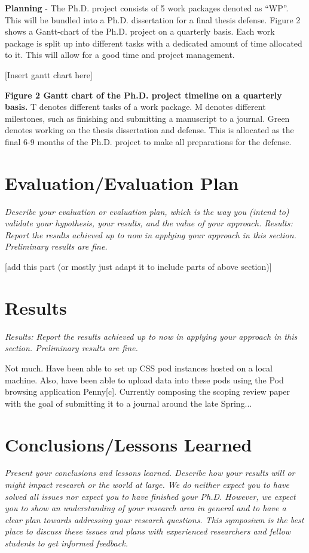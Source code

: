 \documentclass{article}
\begin{document}
\textbf{Planning} - The Ph.D. project consists of 5 work packages denoted as “WP”. This will be bundled into a Ph.D. dissertation for a final thesis defense. Figure 2 shows a Gantt-chart of the Ph.D. project on a quarterly basis.  Each work package is split up into different tasks with a dedicated amount of time allocated to it. This will allow for a good time and project management. 

[Insert gantt chart here]

\textbf{Figure 2 Gantt chart of the Ph.D. project timeline on a quarterly basis.} T denotes different tasks of a work package. M denotes different milestones, such as finishing and submitting a manuscript to a journal. Green denotes working on the thesis dissertation and defense. This is allocated as the final 6-9 months of the Ph.D. project to make all preparations for the defense. 


\section{Evaluation/Evaluation Plan}
\textit{Describe your evaluation or evaluation plan, which is the way you (intend to) validate your hypothesis, your results, and the value of your approach.
Results: Report the results achieved up to now in applying your approach in this section. Preliminary results are fine.}


[add this part (or mostly just adapt it to include parts of above section)]

\section{Results}
\textit{Results: Report the results achieved up to now in applying your approach in this section. Preliminary results are fine.}

Not much. 
Have been able to set up CSS pod instances hosted on a local machine. Also, have been able to upload data into these pods using the Pod browsing application Penny[c]. 
Currently composing the scoping review paper with the goal of submitting it to a journal around the late Spring...





\section{Conclusions/Lessons Learned}
\textit{Present your conclusions and lessons learned. Describe how your results will or might impact research or the world at large. We do neither expect you to have solved all issues nor expect you to have finished your Ph.D. However, we expect you to show an understanding of your research area in general and to have a clear plan towards addressing your research questions. This symposium is the best place to discuss these issues and plans with experienced researchers and fellow students to get informed feedback.}
\end{document}
